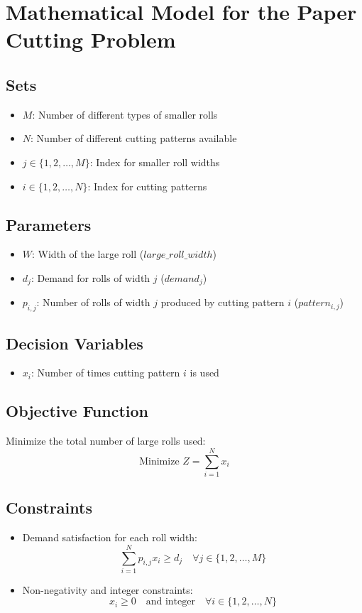\documentclass{article}
\begin{document}
\section*{Mathematical Model for the Paper Cutting Problem}

\subsection*{Sets}
\begin{itemize}
    \item $M$: Number of different types of smaller rolls
    \item $N$: Number of different cutting patterns available
    \item $j \in \{1, 2, \ldots, M\}$: Index for smaller roll widths
    \item $i \in \{1, 2, \ldots, N\}$: Index for cutting patterns
\end{itemize}

\subsection*{Parameters}
\begin{itemize}
    \item $W$: Width of the large roll ($large\_roll\_width$)
    \item $d_j$: Demand for rolls of width $j$ ($demand_j$)
    \item $p_{i,j}$: Number of rolls of width $j$ produced by cutting pattern $i$ ($pattern_{i,j}$)
\end{itemize}

\subsection*{Decision Variables}
\begin{itemize}
    \item $x_i$: Number of times cutting pattern $i$ is used
\end{itemize}

\subsection*{Objective Function}
Minimize the total number of large rolls used:
\[
\text{Minimize } Z = \sum_{i=1}^{N} x_i
\]

\subsection*{Constraints}
\begin{itemize}
    \item Demand satisfaction for each roll width:
    \[
    \sum_{i=1}^{N} p_{i,j} x_i \geq d_j \quad \forall j \in \{1, 2, \ldots, M\}
    \]
    
    \item Non-negativity and integer constraints:
    \[
    x_i \geq 0 \quad \text{and integer} \quad \forall i \in \{1, 2, \ldots, N\}
    \]
\end{itemize}
\end{document}
